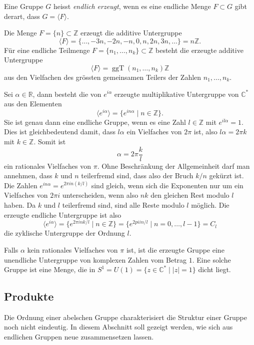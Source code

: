 \begin{definition}
Eine Gruppe $G$ heisst {\em endlich erzeugt}, wenn es eine endliche Menge
$F\subset G$ gibt derart, dass $G=\langle F\rangle$.
%
\end{definition}

\begin{beispiel}
Die Menge $F=\{n\}\subset\mathbb{Z}$ erzeugt die additive Untergruppe
\[
\langle F \rangle
=
\{\dots,-3n,-2n,-n,0,n,2n,3n,\dots\}
=
n\mathbb{Z}.
\]
Für eine endliche Teilmenge $F=\{n_1,\dots,n_k\}\subset\mathbb{Z}$
besteht die erzeugte additive Untergruppe
\[
\langle F\rangle
=
\operatorname{ggT}(n_1,\dots,n_k)\mathbb{Z}
\]
aus den Vielfachen des grössten gemeinsamen Teilers der Zahlen
$n_1,\dots,n_k$.
\end{beispiel}

\begin{beispiel}
Sei $\alpha\in \mathbb{R}$, dann besteht die von $e^{i\alpha}$ erzeugte
multiplikative Untergruppe von $\mathbb{C}^*$ aus den Elementen
\[
\langle e^{i\alpha}\rangle
=
\{ e^{in\alpha}\mid n\in\mathbb{Z}\}.
\]
Sie ist genau dann eine endliche Gruppe, wenn es eine Zahl $l\in\mathbb{Z}$
mit $e^{il\alpha}=1$.
Dies ist gleichbedeutend damit, dass $l\alpha$ ein Vielfaches von $2\pi$
ist, also $l\alpha = 2\pi k$ mit $k\in\mathbb{Z}$.
Somit ist 
\[
\alpha = 2\pi \frac{k}{l}
\]
ein rationales Vielfaches von $\pi$.
Ohne Beschränkung der Allgemeinheit darf man annehmen, dass $k$ und $n$
teilerfremd sind, dass also der Bruch $k/n$ gekürzt ist.
Die Zahlen $e^{in\alpha}=e^{2\pi i n (k/l)}$ sind gleich, wenn 
sich die Exponenten nur um ein Vielfaches von $2\pi i$ unterscheiden,
wenn also $nk$ den gleichen Rest modulo $l$ haben.
Da $k$ und $l$ teilerfremd sind, sind alle Reste modulo $l$ möglich.
Die erzeugte endliche Untergruppe ist also
\[
\langle e^{i\alpha}\rangle
=
\{ e^{2\pi i nk/l}\mid n\in \mathbb{Z} \}
=
\{ e^{2pi i n/l} \mid n=0,\dots,l-1 \}
=
C_l
\]
die zyklische Untergruppe der Ordnung $l$.

Falls $\alpha$ kein rationales Vielfaches von $\pi$ ist, ist die
erzeugte Gruppe eine unendliche Untergruppe von komplexen Zahlen vom
Betrag $1$.
Eine solche Gruppe ist eine Menge, die in
$S^1=U(1)=\{z\in\mathbb{C}^*\mid |z|=1\}$
dicht liegt.
\end{beispiel}

%
%
\subsection{Produkte
\label{buch:diskret:endlich:subsection:produkte}}
Die Ordnung einer abelschen Gruppe charakterisiert die Struktur einer
Gruppe noch nicht eindeutig.
In diesem Abschnitt soll gezeigt werden, wie sich aus endlichen
Gruppen neue zusammensetzen lassen.

